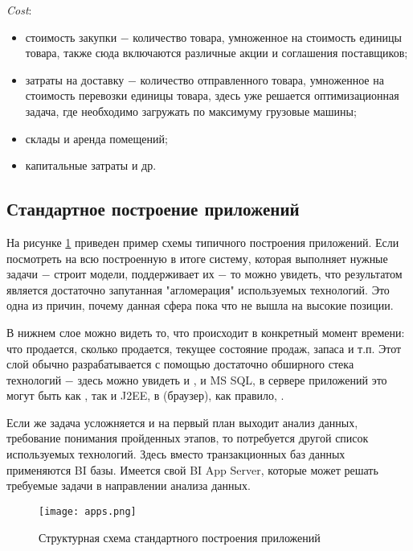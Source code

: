 \emph{Cost}:
\begin{itemize}
  \item стоимость закупки ​− количество товара, умноженное на стоимость единицы товара, также сюда включаются различные акции и соглашения поставщиков;
  \item затраты на доставку ​− количество отправленного товара, умноженное на стоимость перевозки единицы товара, здесь уже решается оптимизационная задача, где необходимо загружать по максимуму грузовые машины;
  \item склады и аренда помещений;
  \item капитальные затраты и др.
\end{itemize}

\subsection{Стандартное построение приложений}
\label{sec:domain:standard_app}

На рисунке \ref{fig:domain:standard_app:app_scheme} приведен пример схемы типичного построения приложений. Если посмотреть на всю построенную в итоге систему, которая выполняет нужные задачи ​− строит модели, поддерживает их ​− то можно увидеть, что результатом является достаточно запутанная "агломерация" исполь\-зу\-е\-мых технологий. Это одна из причин, почему данная сфера пока что не вышла на высокие позиции.

В нижнем слое можно видеть то, что происходит в конкретный момент времени: что продается, сколько продается, текущее состояние продаж, запаса и т.п. Этот слой обычно разрабатывается с помощью достаточно обширного стека технологий ​− здесь можно увидеть и \oracle, и MS SQL, в сервере приложений это могут быть как \dotnet, так и J2EE, в \ui (браузер), как правило, \js.

Если же задача усложняется и на первый план выходит анализ данных, требование понимания пройденных этапов, то потребуется другой список используемых технологий. Здесь вместо транзакционных баз данных применяются BI базы. Имеется свой BI App Server, которые может решать требуемые задачи в направлении анализа данных.

\begin{landscape}
  \begin{figure}
  	\centering
  	\texttt{[image: apps.png]}
  	\caption{Структурная схема стандартного построения приложений}
  	\label{fig:domain:standard_app:app_scheme}
  \end{figure}
\end{landscape}


